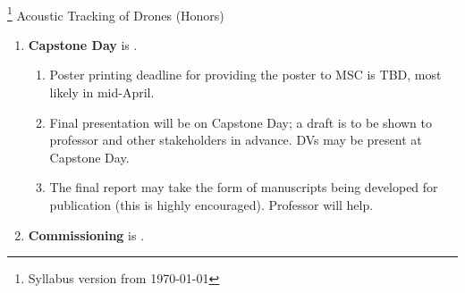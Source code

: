\documentclass[10pt]{article}
\newcommand{\projectname}{Acoustic Tracking of Drones (Honors)}
\begin{document}
\begin{center}
\textbf{\usnaCourseNumber\ \usnaCourseName}\\
\textbf{\courseTerm}\footnote{Syllabus version from \today} \projectname
\end{center}

\begin{enumerate}
\item \textbf{Capstone Day} is . 
\begin{enumerate}
\item Poster printing deadline for providing the poster to MSC is {TBD, most likely in mid-April}. 
\item Final presentation will be on Capstone Day; a draft is to be shown to professor and other stakeholders in advance. DVs may be present at Capstone Day.
\item The final report may take the form of manuscripts being developed for publication (this is highly encouraged). Professor will help.  
\end{enumerate}

\item \textbf{Commissioning} is .
\end{enumerate}
\end{document}
